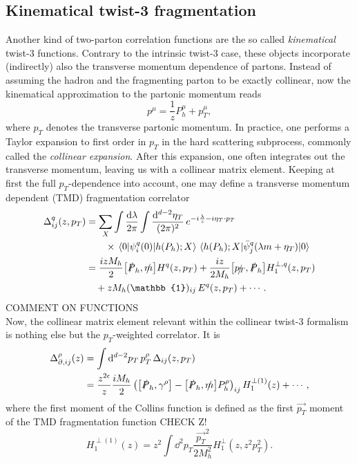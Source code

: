 \subsection{Kinematical twist-3 fragmentation}
Another kind of two-parton correlation functions are the so called \textit{kinematical} twist-3 functions. Contrary to the intrinsic twist-3 case, these objects incorporate (indirectly) also the transverse momentum dependence of partons. Instead of assuming the hadron and the fragmenting parton to be exactly collinear, now the kinematical approximation to the partonic momentum reads
\begin{equation}
    p^\mu = \frac{1}{z}P_h^\mu + p_T^\mu,
\end{equation}
where $p_T$ denotes the transverse partonic momentum. In practice, one performs a Taylor expansion to first order in $p_T$ in the hard scattering subprocess, commonly called the \textit{collinear expansion}. After this expansion, one often integrates out the transverse momentum, leaving us with a collinear matrix element. Keeping at first the full $p_T$-dependence into account, one may define a transverse momentum dependent (TMD) fragmentation correlator
\begin{equation}
    \begin{aligned}
        \Delta^q_{ij}(z,p_T)&= \sum_X\int\frac{\dd \lambda}{2\pi}\int\frac{\dd^{d-2}\eta_T}{(2\pi)^2} \,e^{-i\frac{\lambda}{z}-i\eta_T\cdot p_T}\\
        &\qquad\times\mel{0}{\psi^q_i(0)}{h(P_h);X}\mel{h(P_h);X}{\bar \psi^q_j(\lambda m+\eta_T)}{0}\\
        &= \frac{i z M_h}{2}\comm{\slashed{P}_h}{\slashed{m}}H^q(z,p_T)+\frac{iz}{2M_h}\comm{\slashed{p_T}}{\slashed{P}_h}H_1^{\perp,q}(z,p_T)\\
        &\quad +zM_h(\mathbb{1})_{ij}\,E^q(z,p_T)+\cdots  .
        \end{aligned}
\end{equation}
COMMENT ON FUNCTIONS\\
Now, the collinear matrix element relevant within the collinear twist-3 formalism is nothing else but the $p_T$-weighted correlator. It is
 \begin{equation}
    \begin{aligned}
        \Delta_{\partial,ij}^\rho(z)&= \int\dd^{d-2}p_T\,p_T^\rho\,\Delta_{ij}(z,p_T)\\
        &=\frac{z^{2\epsilon}}{z}\frac{i M_h}{2}\left(\comm{\slashed{P}_h}{\gamma^\rho}-\comm{\slashed{P}_h}{\slashed{m}}P_h^\rho\right)_{ij}H_1^{\perp(1)}(z)+ \cdots,
        \end{aligned}
\end{equation}
where the first moment of the Collins function is defined as the first $\vec{p_T}$ moment of the TMD fragmentation function CHECK Z!
\begin{equation}
    H_1^{\perp(1)}(z)=z^2\int \dd^2 p_T \frac{\vec{p_T}^2}{2 M_h^2}H_1^{\perp}(z,z^2 p_T^2).
\end{equation}

